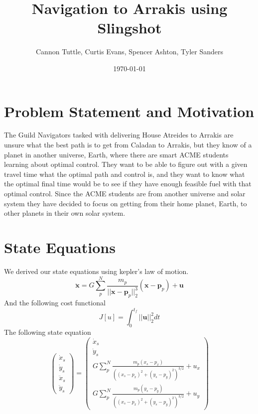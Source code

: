 \documentclass[11pt]{amsart}
\begin{document}
\title{Navigation to Arrakis using Slingshot}
\author{Cannon Tuttle, Curtis Evans, Spencer Ashton, Tyler Sanders}

\date{\today}

\begin{abstract}
    
\end{abstract}

\maketitle

\section{Problem Statement and Motivation}
The Guild Navigators tasked with delivering House Atreides to Arrakis are unsure what the best path is to get from Caladan to Arrakis, but they know of a planet in another universe, Earth, where there 
are smart ACME students learning about optimal control. They want to be able to figure out with a given travel time what the optimal path and control is, and they want to know what the optimal final time 
would be to see if they have enough feasible fuel with that optimal control. Since the ACME students are from another universe and solar system they have decided to focus on getting from their home planet, 
Earth, to other planets in their own solar system. 

\section{State Equations}
We derived our state equations using kepler's law of motion.
\[\ddot{\mathbf{x}} = G\sum_{p}^{N}\frac{m_p}{||\mathbf{x} - \mathbf{p}_p||_2^3}(\mathbf{x} - \mathbf{p}_p) + \mathbf{u}\]
And the following cost functional
\[J[u] = \int_{0}^{t_f}||\mathbf{u}||_2^2dt\]
The following state equation
\[\begin{pmatrix}
    \dot{x}_s \\
    \dot{y}_s \\
    \ddot{x}_s\\
    \ddot{y}_s 
\end{pmatrix} = \begin{pmatrix}
    \dot{x}_s \\
    \dot{y}_s \\
    G\sum_{p}^{N}\frac{m_p(x_s - p_x)}{((x_s-p_x)^2+(y_s-p_y)^2)^{3/2}} + u_x \\
    G\sum_{p}^{N}\frac{m_p(y_s - p_y)}{((x_s-p_x)^2+(y_s-p_y)^2)^{3/2}} + u_y
\end{pmatrix}\]
\end{document}
